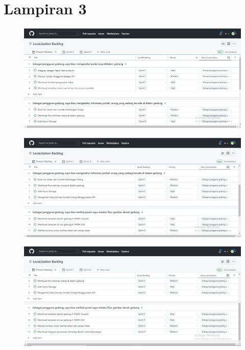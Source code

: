 
\chapter*{Lampiran 3}
\centering
\vspace{0.4cm}

\begin{figure}[H]
  \center
  \includegraphics [width = 13.5 cm, height= 6.75 cm]{gambar/lampiran/scrum1.PNG}
\end{figure}
\begin{figure}[H]
  \center
  \includegraphics [width = 13.5 cm, height= 6.75 cm]{gambar/lampiran/scrum2.PNG}
\end{figure}
\begin{figure}[H]
  \center
  \includegraphics [width = 13.5 cm, height= 6.75 cm]{gambar/lampiran/scrum3.PNG}
\end{figure}
